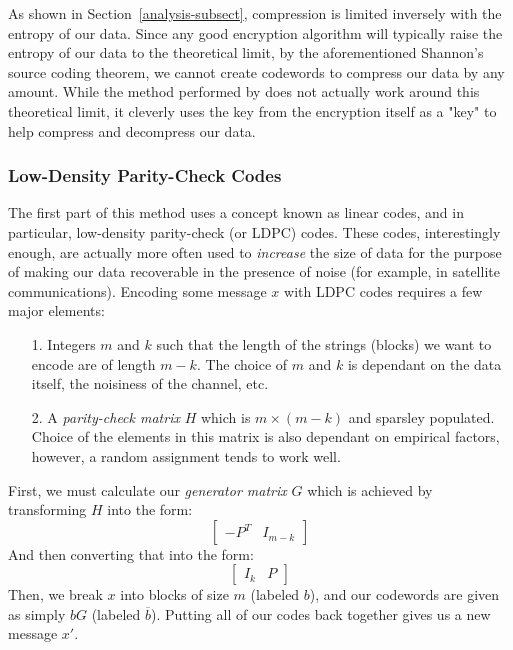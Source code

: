 \documentclass[11pt]{article}
\newcommand\genref{}
\newcommand\sectref{}
\def\genref#1#2{#1~\ref{#2}}
\def\sectref#1{\genref{Section}{#1}}
\begin{document}
As shown in \sectref{analysis-subsect}, compression is limited inversely with the entropy of our data. 
Since any good encryption algorithm will typically raise the entropy of our data to the theoretical limit, 
by the aforementioned Shannon's source coding theorem, we cannot create codewords to compress 
our data by any amount. While the method performed by \cite{johnson} does not actually work around 
this theoretical limit, it cleverly uses the key from the encryption itself as a "key" to help compress and 
decompress our data. 

\subsubsection{Low-Density Parity-Check Codes}\label{ldpc-subsubsect}
The first part of this method uses a concept known as linear codes, and in particular, 
low-density parity-check (or LDPC) codes\cite{gallager}.
These codes, interestingly enough, are actually more often used to \emph{increase} the size of data for the purpose of 
making our data recoverable in the presence of noise (for example, in satellite communications). 
Encoding some message $x$ with LDPC codes requires a few major elements: 
\begin{itemize}
	\item[1.]Integers $m$ and $k$ such that the length of the strings (blocks) we want to encode are of length $m-k$. 
The choice of $m$ and $k$ is dependant on the data itself, the noisiness of the channel, etc. 
	\item[2.]A \emph{parity-check matrix} $H$ which is $m\times (m-k)$ and sparsley populated. 
Choice of the elements in this matrix is also dependant on empirical factors, however, a random assignment tends to work well. 
\end{itemize}
First, we must calculate our \emph{generator matrix} $G$ which is achieved by transforming $H$ into the form:
\[ \left[
\begin{array}{c|c}
	-P^T & I_{m-k}
\end{array}
\right] \]
And then converting that into the form: 
\[ \left[
\begin{array}{c|c}
	I_k & P
\end{array}
\right] \]
Then, we break $x$ into blocks of size $m$ (labeled $b$), and our codewords are given as simply $bG$ (labeled $\overline{b}$). 
Putting all of our codes back together gives us a new message $x'$.
\end{document}

